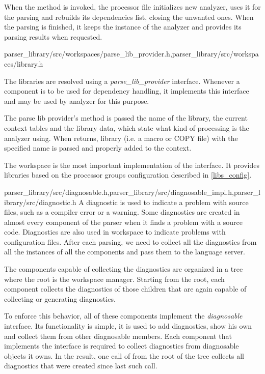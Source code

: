 When the  method is invoked, the processor file initializes new analyzer, uses it for the parsing and rebuilds its dependencies list, closing the unwanted ones. When the parsing is finished, it keeps the instance of the analyzer and provides its parsing results when requested.


{parser\_library/src/workspaces/parse\_lib\_provider.h,parser\_library/src/workspaces/library.h}

The libraries are resolved using a \emph{parse\_lib\_provider} interface. Whenever a component is to be used for dependency handling, it implements this interface and may be used by analyzer for this purpose.

The parse lib provider's  method is passed the name of the library, the current context tables and the library data, which state what kind of processing is the analyzer using. When  returns, library (i.e. a macro or COPY file) with the specified name is parsed and properly added to the context.

The workspace is the most important implementation of the  interface. It provides libraries based on the processor groups configuration described in \cref{libs_config}.

{parser\_library/src/diagnosable.h,parser\_library/src/diagnosable\_impl.h,parser\_library/src/diagnostic.h}
A diagnostic is used to indicate a problem with source files, such as a compiler error or a warning. Some diagnostics are created in almost every component of the parser when it finds a problem with a source code. Diagnostics are also used in workspace to indicate problems with configuration files. After each parsing, we need to collect all the diagnostics from all the instances of all the components and pass them to the language server.

The components capable of collecting the diagnostics are organized in a tree where the root is the workspace manager. Starting from the root, each component collects the diagnostics of those children that are again capable of collecting or generating diagnostics.

To enforce this behavior, all of these components implement the \emph{diagnosable} interface. Its functionality is simple, it is used to add diagnostics, show his own and collect them from other diagnosable members. Each component that implements the interface is required to collect diagnostics from diagnosable objects it owns. In the result, one call of  from the root of the tree collects all diagnostics that were created since last such call.

